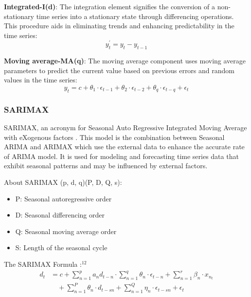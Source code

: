 \documentclass{ieeeojies}
\begin{document}
\textbf{Integrated-I(d)}: The integration element signifies the conversion of a non-stationary time series into a stationary state through differencing operations. This procedure aids in eliminating trends and enhancing predictability in the time series:
\begin{equation*}
    y_t^{'} = y_t - y_{t-1}
\end{equation*}

\textbf{Moving average-MA(q)}: The moving average component uses moving average parameters to predict the current value based on previous errors and random values in the time series:
\begin{equation*}
    y_t = c + \theta_1 \cdot \epsilon_{t-1} + \theta_2 \cdot \epsilon_{t-2} + \theta_q \cdot \epsilon_{t-q} + \epsilon_t
\end{equation*}

\subsubsection{\textbf{SARIMAX}}
SARIMAX, an acronym for Seasonal Auto Regressive Integrated Moving Average with eXogenous factors . This model is the combination between Seasonal ARIMA and ARIMAX which use the external data to enhance the accurate rate of ARIMA model. It is used for modeling and forecasting time series data that exhibit seasonal patterns and may be influenced by external factors.

About SARIMAX (p, d, q)(P, D, Q, s):
\begin{itemize}
    \item P: Seasonal autoregressive order
    \item D: Seasonal differencing order
    \item Q: Seasonal moving average order
    \item S: Length of the seasonal cycle
\end{itemize}

The SARIMAX Formula $:^{12}$
\begin{equation*}
\begin{aligned}
    d_t &= c + \sum_{n=1}^p a_n d_{t-n} \cdot \sum_{n=1}^q \theta_n \cdot \epsilon_{t-n} + \sum_{n=1}^r \beta_n \cdot x_{n_t} \\
    &\quad + \sum_{n=1}^P \theta_n \cdot d_{t-sn} + \sum_{n=1}^Q \eta_n \cdot \epsilon_{t-sn} + \epsilon_t
\end{aligned}
\end{equation*}
\end{document}
